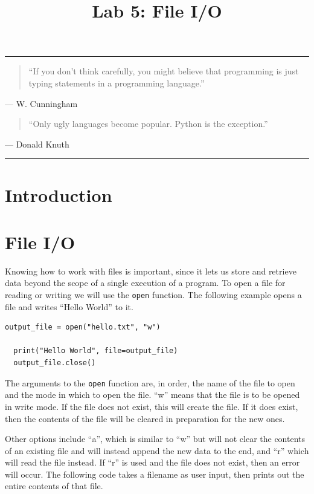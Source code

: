 \documentclass[11pt]{cselabheader}
\title{Lab 5: File I/O}
\begin{document}
\maketitle

\hrule
\begin{quotation}
  ``If you don't think carefully, you might believe that programming is just
  typing statements in a programming language.''
\end{quotation}
\begin{flushright}
  --- W. Cunningham
\end{flushright}

\begin{quotation}
  ``Only ugly languages become popular. Python is the exception.''
\end{quotation}
\begin{flushright}
  --- Donald Knuth
\end{flushright}

\hrule

\section{Introduction}


\section{File I/O}
Knowing how to work with files is important, since it lets us store and retrieve data beyond the scope of a single execution of a program. To open a file for reading or writing we will use the \lstinline{open} function. The following example opens a file and writes ``Hello World'' to it.

\begin{lstlisting}[style=python]
  output_file = open("hello.txt", "w")

  print("Hello World", file=output_file)
  output_file.close()
\end{lstlisting}

The arguments to the \lstinline{open} function are, in order, the name of the file to open and the mode in which to open the file. ``w'' means that the file is to be opened in write mode. If the file does not exist, this will create the file. If it does exist, then the contents of the file will be cleared in preparation for the new ones.

Other options include ``a'', which is similar to ``w'' but will not clear the contents of an existing file and will instead append the new data to the end, and ``r'' which will read the file instead. If ``r'' is used and the file does not exist, then an error will occur. The following code takes a filename as user input, then prints out the entire contents of that file.
\end{document}
